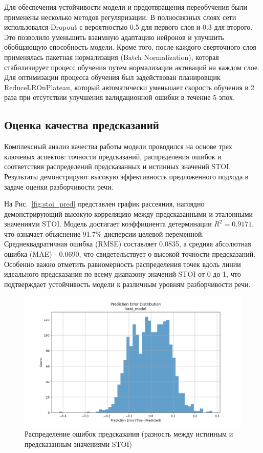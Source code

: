 \documentclass[oneside, final, 14pt]{extarticle}
\begin{document}
Для обеспечения устойчивости модели и предотвращения переобучения были применены несколько методов регуляризации. В полносвязных слоях сети использовался Dropout с вероятностью 0.5 для первого слоя и 0.3 для второго. Это позволило уменьшить взаимную адаптацию нейронов и улучшить обобщающую способность модели. Кроме того, после каждого сверточного слоя применялась пакетная нормализация (Batch Normalization), которая стабилизирует процесс обучения путем нормализации активаций на каждом слое. Для оптимизации процесса обучения был задействован планировщик ReduceLROnPlateau, который автоматически уменьшает скорость обучения в 2 раза при отсутствии улучшения валидационной ошибки в течение 5 эпох.


\subsection{Оценка качества предсказаний}

Комплексный анализ качества работы модели проводился на основе трех ключевых аспектов: точности предсказаний, распределения ошибок и соответствия распределений предсказанных и истинных значений STOI. Результаты демонстрируют высокую эффективность предложенного подхода в задаче оценки разборчивости речи.

На Рис.~\ref{fig:stoi_pred} представлен график рассеяния, наглядно демонстрирующий высокую корреляцию между предсказанными и эталонными значениями STOI. Модель достигает коэффициента детерминации $R^2 = 0.9171$, что означает объяснение 91.7\% дисперсии целевой переменной. Среднеквадратичная ошибка (RMSE) составляет 0.0835, а средняя абсолютная ошибка (MAE) - 0.0690, что свидетельствует о высокой точности предсказаний. Особенно важно отметить равномерность распределения точек вдоль линии идеального предсказания по всему диапазону значений STOI от 0 до 1, что подтверждает устойчивость модели к различным уровням разборчивости речи.

\begin{figure}[]
\centering
\includegraphics[width=1\linewidth]{best_model_error_dist.png}
\caption{Распределение ошибок предсказания (разность между истинным и предсказанным значениями STOI)}
\label{fig:error_dist}
\end{figure}
\end{document}
